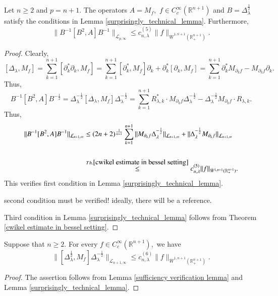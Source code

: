 \documentclass{amsart}
\begin{document}
\begin{lemma}\label{sufficiency verification lemma} Let $n\geq 2$ and $p=n+1.$ The operators $A=M_f,$ $f\in C^{\infty}_c(\mathbb{R}^{n+1})$ and $B=\Delta_{\lambda}^{\frac12}$ satisfy the conditions in Lemma \ref{surprisingly_technical_lemma}. Furthermore,
$$\|B^{-1}[B^2,A]B^{-1}\|_{\mathcal{L}_{p,\infty}}\leq c_{n,\lambda}^{(5)}\|f\|_{\dot{W}^{1,n+1}(\mathbb{R}^{n+1}_+)}.$$
\end{lemma}
\begin{proof} Clearly,
$$[\Delta_{\lambda},M_f]=\sum_{k=1}^{n+1}[\partial_k^{\ast}\partial_k,M_f]=\sum_{k=1}^{n+1}[\partial_k^{\ast},M_f]\partial_k+\partial_k^{\ast}[\partial_k,M_f]=\sum_{k=1}^{n+1}\partial_k^{\ast}M_{\partial_kf}-M_{\partial_kf}\partial_k.$$
Thus,
$$B^{-1}[B^2,A]B^{-\frac12}=\Delta_\lambda^{-\frac12}[\Delta_{\lambda},M_f]\Delta_\lambda^{-\frac12}=\sum_{k=1}^{n+1}R_{\lambda,k}^{\ast}\cdot M_{\partial_kf}\Delta_{\lambda}^{-\frac12}-\Delta_{\lambda}^{-\frac12}M_{\partial_kf}\cdot R_{\lambda,k}.$$
Thus,
\begin{align*}
\|B^{-1}[B^2,A]B^{-1}\|_{\mathcal{L}_{n+1,\infty}}&\leq (2n+2)^{\frac1{n+1}}\sum_{k=1}^{n+1}\|M_{\partial_kf}\Delta_{\lambda}^{-\frac12}\|_{\mathcal{L}_{n+1,\infty}}+\|\Delta_{\lambda}^{-\frac12}M_{\partial_kf}\|_{\mathcal{L}_{n+1,\infty}}\\
\\&\stackrel{Th.\ref{cwikel estimate in bessel setting}}{\leq} c_{n,\lambda}^{(5)}\|f\|_{\dot{W}^{1,n+1}(\mathbb{R}^{n+1}_+)}.
\end{align*}
This verifies first condition in Lemma \ref{surprisingly_technical_lemma}.
	
{\color{red} second condition must be verified! ideally, there will be a reference.}
	
Third condition in Lemma \ref{surprisingly_technical_lemma} follows from Theorem \ref{cwikel estimate in bessel setting}.
\end{proof}

\begin{lemma}\label{main sufficiency lemma} Suppose that $n\geq 2.$ For every $f\in C^{\infty}_c(\mathbb{R}^{n+1}),$ we have
$$\|[\Delta_\lambda^{\frac12},M_f]\Delta_\lambda^{-\frac12}\|_{\mathcal{L}_{n+1,\infty}}\leq c_{n,\lambda}^{(6)}\|f\|_{\dot{W}^{1,n+1}(\mathbb{R}_+^{n+1})}.$$
\end{lemma}
\begin{proof} The assertion follows from Lemma \ref{sufficiency verification lemma} and Lemma \ref{surprisingly_technical_lemma}.
\end{proof}
\end{document}
